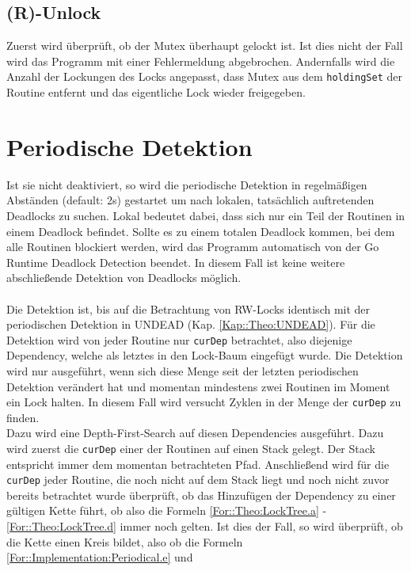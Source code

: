 \subsection{(R)-Unlock}
Zuerst wird überprüft, ob der Mutex überhaupt gelockt ist. Ist dies nicht der 
Fall wird das Programm mit einer Fehlermeldung abgebrochen. Andernfalls
wird die Anzahl der Lockungen des Locks angepasst, dass Mutex aus dem 
\texttt{holdingSet} der Routine entfernt und das eigentliche Lock wieder freigegeben.

\section{Periodische Detektion} \label{Kap::Implementation:Periodical}
Ist sie nicht deaktiviert, so wird die periodische Detektion in regelmäßigen 
Abständen (default: 2s) gestartet
um nach lokalen, tatsächlich auftretenden Deadlocks zu suchen.
Lokal bedeutet 
dabei, dass sich nur ein Teil der Routinen in einem Deadlock befindet. Sollte 
es zu einem totalen Deadlock kommen, bei dem alle Routinen blockiert werden, 
wird das Programm automatisch von der Go Runtime Deadlock Detection
beendet. In 
diesem Fall ist keine weitere abschließende Detektion von Deadlocks möglich.\\\\
Die Detektion ist, bis auf die Betrachtung von RW-Locks identisch mit der periodischen
Detektion in UNDEAD (Kap. \ref{Kap::Theo:UNDEAD}).
Für die Detektion wird von jeder Routine nur \texttt{curDep} betrachtet,
also diejenige Dependency, welche als letztes in den Lock-Baum eingefügt wurde. 
Die Detektion wird nur ausgeführt, wenn sich diese Menge seit der letzten 
periodischen Detektion verändert hat und momentan mindestens zwei Routinen im 
Moment ein Lock halten.
In diesem Fall wird versucht Zyklen in der Menge der \texttt{curDep} zu finden.\\
Dazu wird eine Depth-First-Search auf diesen Dependencies ausgeführt. Dazu wird 
zuerst die \texttt{curDep} einer der Routinen auf einen Stack gelegt. Der Stack 
entspricht immer dem momentan betrachteten Pfad. Anschließend wird für 
die \texttt{curDep} jeder Routine, die noch nicht auf dem Stack liegt und noch 
nicht zuvor bereits betrachtet wurde überprüft,
ob das Hinzufügen der Dependency zu einer gültigen Kette führt, ob also 
die Formeln \eqref{For::Theo:LockTree.a} - \eqref{For::Theo:LockTree.d} immer noch 
gelten. Ist dies der Fall, so wird überprüft, ob die Kette einen Kreis 
bildet, also ob die Formeln \eqref{For::Implementation:Periodical.e} und 
